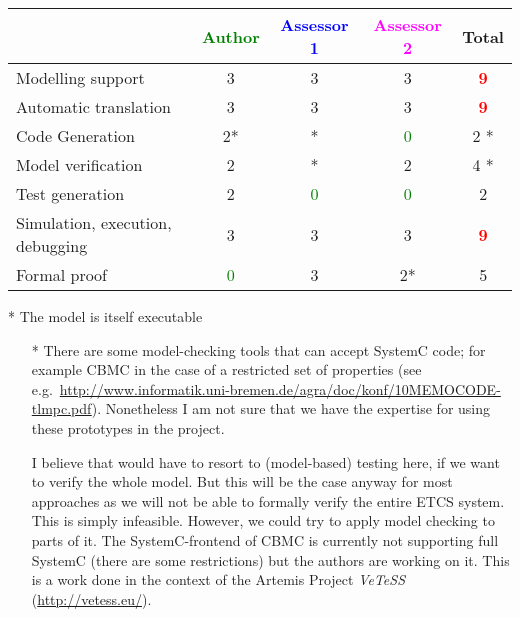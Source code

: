 \begin{tabular}{|l | c | c | c | c|}
\hline
& \textcolor{green}{Author} & \textcolor{blue}{Assessor 1} & \textcolor{magenta}{Assessor 2} & Total \\
\hline
Modelling support &3 &3 &3 & \textcolor{red}{\textbf{9}} \\
\hline
Automatic translation &3 &3 &3 & \textcolor{red}{\textbf{9}} \\
\hline
Code Generation &2* & * & \textcolor{green}{0}   & 2   * \\
\hline
Model verification &2 & * &2 & 4   * \\
\hline
Test generation &2 & \textcolor{green}{0}   & \textcolor{green}{0}   & 2    \\
\hline
Simulation, execution, debugging &3 &3 &3 & \textcolor{red}{\textbf{9}} \\
\hline
Formal proof & \textcolor{green}{0}   &3 &2* &  5\\
\hline
\end{tabular}

\begin{author_comment}
 * The model is itself executable
\end{author_comment}



\begin{assessor2}
  \begin{itemize}
  \item[*] There are some model-checking tools that can accept SystemC
    code; for example CBMC in the case of a restricted set of
    properties (see
    e.g.~\url{http://www.informatik.uni-bremen.de/agra/doc/konf/10MEMOCODE-tlmpc.pdf}). Nonetheless
    I am not sure that we have the expertise for using these
    prototypes in the project.
\begin{author_comment}
I believe that would have to resort to (model-based) testing here, if we want to verify the whole model. But this will be the case anyway for most approaches as we will not be able to formally verify the entire ETCS system. This is simply infeasible. However, we could try to apply model checking to parts of it. The SystemC-frontend of CBMC is currently not supporting full SystemC (there are some restrictions) but the authors are working on it. This is a work done in the context of the Artemis Project \emph{VeTeSS} (\url{http://vetess.eu/}).
\end{author_comment}
  \end{itemize}  
\end{assessor2}




